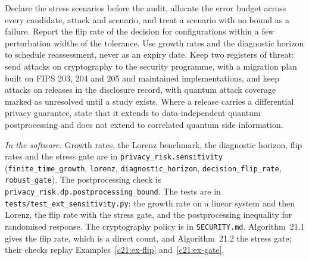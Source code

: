 \begin{inpractice}
Declare the stress scenarios before the audit, allocate the error budget across every candidate,
attack and scenario, and treat a scenario with no bound as a failure. Report the flip rate of the
decision for configurations within a few perturbation widths of the tolerance. Use growth rates and
the diagnostic horizon to schedule reassessment, never as an expiry date. Keep two registers of
threat: send attacks on cryptography to the security programme, with a migration plan built on
FIPS 203, 204 and 205 and maintained implementations, and keep attacks on releases in the
disclosure record, with quantum attack coverage marked as unresolved until a study exists. Where a
release carries a differential privacy guarantee, state that it extends to data-independent
quantum postprocessing and does not extend to correlated quantum side information.

\medskip\noindent\textit{In the software.} Growth rates, the Lorenz benchmark, the diagnostic horizon, flip rates and the
stress gate are in \texttt{privacy\_risk.sensitivity} (\texttt{finite\_time\_growth}, \texttt{lorenz},
\texttt{diagnostic\_horizon}, \texttt{decision\_flip\_rate}, \texttt{robust\_gate}). The postprocessing check is
\texttt{privacy\_risk.dp.postprocessing\_bound}. The tests are in \texttt{tests/test\_ext\_sensitivity.py}: the growth rate on a linear system and then Lorenz, the flip rate with the stress gate, and the postprocessing inequality for randomised response. The cryptography policy is in \texttt{SECURITY.md}. Algorithm~21.1 gives the flip rate, which is a direct count, and Algorithm~21.2 the stress gate; their checks replay Examples~\ref{c21:ex-flip} and~\ref{c21:ex-gate}.
\end{inpractice}


